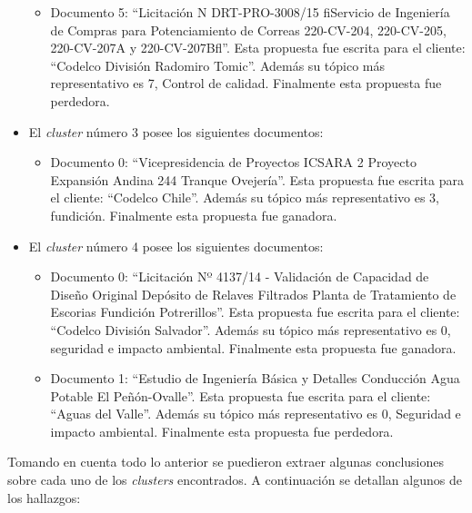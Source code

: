 \begin{itemize}
\begin{itemize}
            \item Documento 5: ``Licitación N  DRT-PRO-3008/15 ﬁServicio de Ingeniería de Compras para Potenciamiento de Correas 220-CV-204, 220-CV-205, 220-CV-207A y 220-CV-207Bﬂ''. Esta propuesta fue escrita para el cliente: ``Codelco División Radomiro Tomic''. Además su tópico más representativo es 7, Control de calidad.
            Finalmente esta propuesta fue perdedora.
        \end{itemize}
        \item El \textit{cluster} número 3 posee los siguientes documentos:
        \begin{itemize}
            \item Documento 0: ``Vicepresidencia de Proyectos ICSARA 2 Proyecto Expansión Andina 244 Tranque Ovejería''. Esta propuesta fue escrita para el cliente: ``Codelco Chile''. Además su tópico más representativo es 3, fundición. Finalmente esta propuesta fue ganadora.
        \end{itemize}
        \item El \textit{cluster} número 4 posee los siguientes documentos:
        \begin{itemize}
            \item Documento 0: ``Licitación  Nº 4137/14 - Validación de Capacidad de Diseño Original Depósito de Relaves Filtrados Planta de Tratamiento de Escorias Fundición Potrerillos''. Esta propuesta fue escrita para el cliente: ``Codelco División Salvador''. Además su tópico más representativo es 0, seguridad e impacto ambiental. Finalmente esta propuesta fue ganadora.
            
            \item Documento 1: ``Estudio de Ingeniería Básica y Detalles Conducción Agua Potable El Peñón-Ovalle''. Esta propuesta fue escrita para el cliente: ``Aguas del Valle''. Además su tópico más representativo es 0, Seguridad e impacto ambiental. Finalmente esta propuesta fue perdedora.
        \end{itemize}
    \end{itemize}
    Tomando en cuenta todo lo anterior se puedieron extraer algunas conclusiones sobre cada uno de los \textit{clusters} encontrados. A continuación se detallan algunos de los hallazgos:
    

